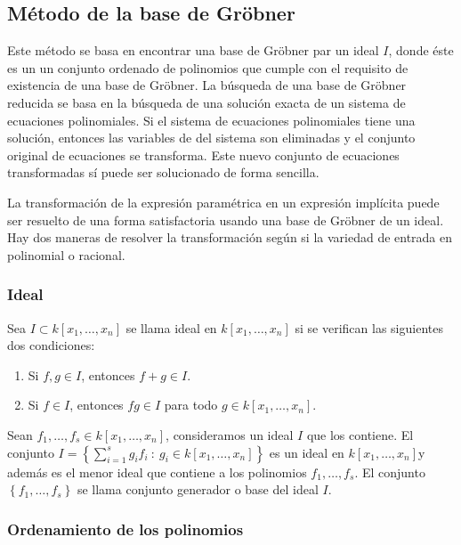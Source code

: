 \subsection{Método de la base de Gröbner}

Este método se basa en encontrar una base de Gröbner par un ideal $I$, donde éste es un un conjunto ordenado de polinomios que cumple con el requisito de existencia de una base de Gröbner. La búsqueda  de una base de Gröbner reducida se basa en la búsqueda de una solución exacta de un sistema de ecuaciones polinomiales. Si el sistema de ecuaciones polinomiales tiene una solución, entonces las variables de del sistema son eliminadas y el conjunto original de ecuaciones se transforma. Este nuevo conjunto de ecuaciones transformadas sí puede ser solucionado de forma sencilla.

La transformación de la expresión paramétrica en un expresión implícita puede ser resuelto de una forma satisfactoria usando una base de Gröbner de un ideal. Hay dos maneras de resolver la transformación según si la variedad de entrada en polinomial o racional.

\subsubsection*{Ideal}

Sea $I \subset k[x_1, \dotso, x_n]$ se llama ideal en $k[x_1, \dotso, x_n]$ si se verifican las siguientes dos condiciones:

\begin{enumerate}
    \item Si $f, g \in I$, entonces $f + g \in I$.
    \item Si $f \in I$, entonces $fg \in I$ para todo $g \in k[x_1, \dotso, x_n]$.
\end{enumerate}

Sean $f_1, \dotso, f_s \in k[x_1, \dotso, x_n]$, consideramos un ideal $I$ que los contiene. El conjunto $I =  \left\{ \sum_{i=1}^{s} g_i f_i \ : \ g_i \in k[x_1, \dotso, x_n] \right\}$ es un ideal en $k[x_1, \dotso, x_n]$y además es el menor ideal que contiene a los polinomios $f_1, \dotso, f_s$. El conjunto $\left\{ f_1, \dotso, f_s \right\}$ se llama conjunto generador o base del ideal $I$. 

\subsubsection*{Ordenamiento de los polinomios}

